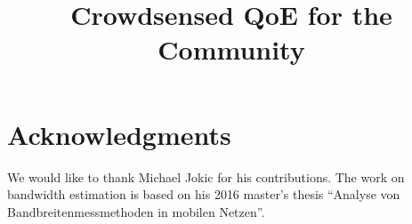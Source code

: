 \documentclass[conference,10pt,a4paper]{IEEEtran}
\begin{document}
\title{Crowdsensed QoE for the Community}



\author{
\and
{}
}

\maketitle









\section*{Acknowledgments}
We would like to thank Michael Jokic for his contributions. The work on bandwidth estimation is based on his 2016 master's thesis ``Analyse von Bandbreitenmessmethoden in mobilen Netzen''.

\balance
\printbibliography
\end{document}
